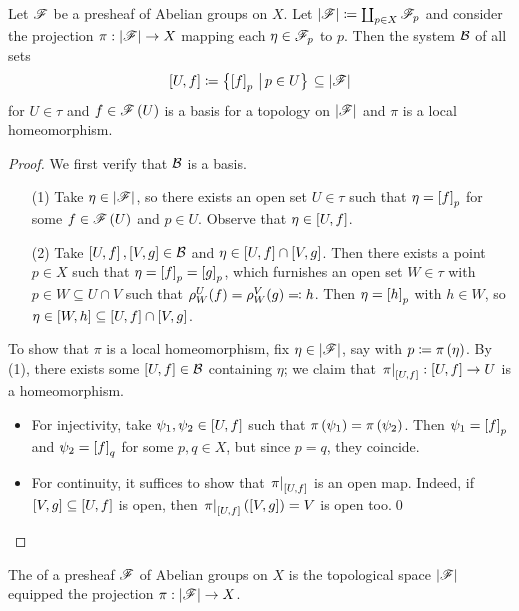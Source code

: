\documentclass[../Moduli_Spaces_of_Riemann_Surfaces.tex]{subfiles}
\begin{document}
    \begin{proposition}\label{2.2:prp:basis_stalk}
        Let $\mathscr{F}$ be a presheaf of Abelian groups on $X$. Let $\left|\mathscr{F}\right|\coloneqq\coprod_{p\in X}\mathscr{F}_p$ and consider the projection $\pi:\left|\mathscr{F}\right|\to X$ mapping each $\eta\in\mathscr{F}_p$ to $p$. Then the system $\mathcal{B}$ of all sets
        \begin{equation*}
            \left[U,f\right]\coloneqq\bigl\{\left[f\right]_p\,\left|\,p\in U\bigr\}\right.\subseteq\left|\mathscr{F}\right|
        \end{equation*}
        for $U\in\tau$ and $f\in\mathscr{F}\left(U\right)$ is a basis for a topology on $\left|\mathscr{F}\right|$ and $\pi$ is a local homeomorphism.
    \end{proposition}
    \begin{proof}
        We first verify that $\mathcal{B}$ is a basis.
        \begin{enumerate}
            \item[(1)] Take $\eta\in\left|\mathscr{F}\right|$, so there exists an open set $U\in\tau$ such that $\eta=\left[f\right]_p$ for some $f\in\mathscr{F}\left(U\right)$ and $p\in U$. Observe that $\eta\in\left[U,f\right]$.
            \item[(2)] Take $\left[U,f\right],\left[V,g\right]\in\mathcal{B}$ and $\eta\in\left[U,f\right]\cap\left[V,g\right]$. Then there exists a point $p\in X$ such that $\eta=\left[f\right]_p=\left[g\right]_p$, which furnishes an open set $W\in\tau$ with $p\in W\subseteq U\cap V$ such that $\rho^U_W\!\left(f\right)=\rho^V_W\!\left(g\right)\eqqcolon h$. Then $\eta=\left[h\right]_p$ with $h\in W$, so $\eta\in\left[W,h\right]\subseteq\left[U,f\right]\cap\left[V,g\right]$.
        \end{enumerate}
        To show that $\pi$ is a local homeomorphism, fix $\eta\in\left|\mathscr{F}\right|$, say with $p\coloneqq\pi\left(\eta\right)$. By (1), there exists some $\left[U,f\right]\in\mathcal{B}$ containing $\eta$; we claim that $\left.\pi\right|_{\left[U,f\right]}:\left[U,f\right]\to U$ is a homeomorphism.
        \begin{itemize}
            \item For injectivity, take $\psi_1,\psi_2\in\left[U,f\right]$ such that $\pi\left(\psi_1\right)=\pi\left(\psi_2\right)$. Then $\psi_1=\left[f\right]_p$ and $\psi_2=\left[f\right]_q$ for some $p,q\in X$, but since $p=q$, they coincide.
            \item For continuity, it suffices to show that $\left.\pi\right|_{\left[U,f\right]}$ is an open map. Indeed, if $\left[V,g\right]\subseteq\left[U,f\right]$ is open, then $\left.\pi\right|_{\left[U,f\right]}\left(\left[V,g\right]\right)=V$ is open too.\qed
        \end{itemize}
    \end{proof}
    \begin{definition}
        The  of a presheaf $\mathscr{F}$ of Abelian groups on $X$ is the topological space $\left|\mathscr{F}\right|$ equipped the projection $\pi:\left|\mathscr{F}\right|\to X$.
    \end{definition}
\end{document}

